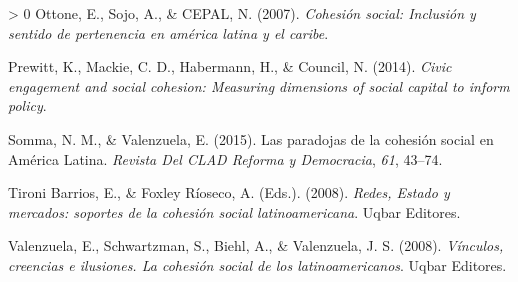 \documentclass[
  12pt,
]{book}
\newlength{\cslhangindent}
\newenvironment{CSLReferences}[3] %
 {%
  \setlength{\parindent}{0pt}
  \ifodd #1 \everypar{\setlength{\hangindent}{\cslhangindent}}\ignorespaces\fi
  \ifnum #2 > 0
  \setlength{\parskip}{#2\baselineskip}
  \fi
 }%
 {}
\begin{document}
\begin{CSLReferences}{1}{0}
\leavevmode\hypertarget{ref-ottone2007cohesion}{}%
Ottone, E., Sojo, A., \& CEPAL, N. (2007). \emph{Cohesi{ó}n social: Inclusi{ó}n y sentido de pertenencia en am{é}rica latina y el caribe}.

\leavevmode\hypertarget{ref-prewitt_Civic_2014}{}%
Prewitt, K., Mackie, C. D., Habermann, H., \& Council, N. (2014). \emph{Civic engagement and social cohesion: {Measuring} dimensions of social capital to inform policy}.

\leavevmode\hypertarget{ref-somma2015paradojas}{}%
Somma, N. M., \& Valenzuela, E. (2015). Las paradojas de la cohesión social en {América Latina}. \emph{Revista Del CLAD Reforma y Democracia}, \emph{61}, 43--74.

\leavevmode\hypertarget{ref-tironibarrios_Redes_2008}{}%
Tironi Barrios, E., \& Foxley Ríoseco, A. (Eds.). (2008). \emph{{Redes, Estado y mercados: soportes de la cohesión social latinoamericana}}. {Uqbar Editores}.

\leavevmode\hypertarget{ref-valenzuela_Vinculos_2008}{}%
Valenzuela, E., Schwartzman, S., Biehl, A., \& Valenzuela, J. S. (2008). \emph{Vínculos, creencias e ilusiones. {La} cohesión social de los latinoamericanos}. {Uqbar Editores}.

\end{CSLReferences}
\end{document}
